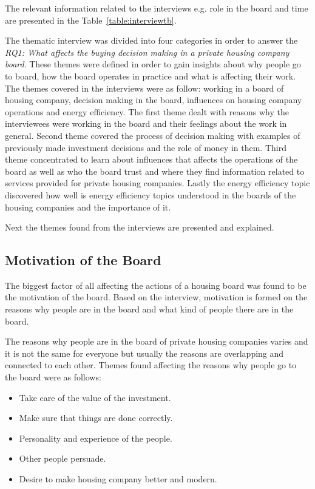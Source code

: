 The relevant information related to the interviews e.g. role in the board and time are presented in the Table~\ref{table:interviewtb}. 

The thematic interview was divided into four categories in order to answer the \emph{RQ1: What affects the buying decision making in a private housing company board}. These themes were defined in order to gain insights about why people go to board, how the board operates in practice and what is affecting their work. The themes covered in the interviews were as follow: working in a board of housing company, decision making in the board, influences on housing company operations and energy efficiency. The first theme dealt with reasons why the interviewees were working in the board and their feelings about the work in general. Second theme covered the process of decision making with examples of previously made investment decisions and the role of money in them. Third theme concentrated to learn about influences that affects the operations of the board as well as who the board trust and where they find information related to services provided for private housing companies. Lastly the energy efficiency topic discovered how well is energy efficiency topics understood in the boards of the housing companies and the importance of it.

Next the themes found from the interviews are presented and explained.

\subsection{Motivation of the Board}

The biggest factor of all affecting the actions of a housing board was found to be the motivation of the board. Based on the interview, motivation is formed on the reasons why people are in the board and what kind of people there are in the board.

The reasons why people are in the board of private housing companies varies and it is not the same for everyone but usually the reasons are overlapping and connected to each other. Themes found affecting the reasons why people go to the board were as follows:
\begin{itemize}
	\setlength{\itemsep}{1pt}
	\item Take care of the value of the investment.
	\item Make sure that things are done correctly.
	\item Personality and experience of the people.
	\item Other people persuade.
	\item Desire to make housing company better and modern.
\end{itemize}


